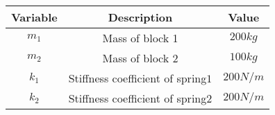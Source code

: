     \begin{tabular}{|c|c|c|} 
    \hline
\textbf{Variable} & \textbf{Description} & \textbf{Value} \\\hline
    $m_1$ & Mass of block 1 & $200kg$  \\\hline
    $m_2$ & Mass of block 2 & $100kg$  \\\hline
    $k_1$ & Stiffness coefficient of spring$1$ & $200N/m$  \\\hline
    $k_2$ & Stiffness coefficient of spring$2$ & $200N/m$  \\\hline
        \end{tabular}
    
        
